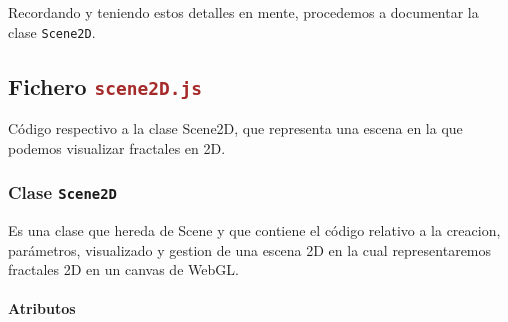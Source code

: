 Recordando y teniendo estos detalles en mente, procedemos a documentar la clase \verb|Scene2D|.

\subsection{Fichero \Large\texttt{\textcolor{brown}{scene2D.js}}}

Código respectivo a la clase Scene2D, que representa una escena en la que podemos visualizar fractales en 2D.

\subsubsection{Clase \Large\texttt{\textcolor{Bittersweet}{Scene2D}}}

Es una clase que hereda de Scene y que contiene el código relativo a la creacion, parámetros, visualizado y gestion de una escena 2D en la cual representaremos fractales 2D en un canvas de WebGL.

\paragraph*{Atributos}

